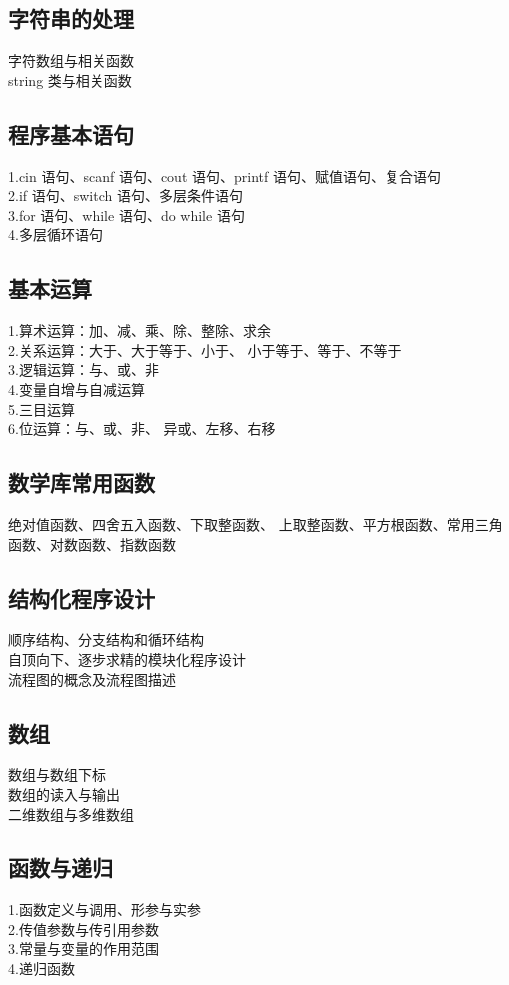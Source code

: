 \documentclass[12pt,twiside,a4paper]{ctexbook}
\numberwithin{chapter}{part}
\begin{document}
\subsection{字符串的处理}
字符数组与相关函数\\
string 类与相关函数

\subsection{程序基本语句}
1.cin 语句、scanf 语句、cout 语句、printf
语句、赋值语句、复合语句\\
2.if 语句、switch 语句、多层条件语句\\
3.for 语句、while 语句、do while 语句\\
4.多层循环语句

\subsection{基本运算}
1.算术运算：加、减、乘、除、整除、求余\\
2.关系运算：大于、大于等于、小于、
小于等于、等于、不等于\\
3.逻辑运算：与、或、非\\
4.变量自增与自减运算\\
5.三目运算\\
6.位运算：与、或、非、
异或、左移、右移

\subsection{数学库常用函数}
绝对值函数、四舍五入函数、下取整函数、
上取整函数、平方根函数、常用三角
函数、对数函数、指数函数

\subsection{结构化程序设计}
顺序结构、分支结构和循环结构\\
自顶向下、逐步求精的模块化程序设计\\
流程图的概念及流程图描述

\subsection{数组}
数组与数组下标\\
数组的读入与输出\\
二维数组与多维数组

\subsection{函数与递归}
1.函数定义与调用、形参与实参\\
2.传值参数与传引用参数\\
3.常量与变量的作用范围\\
4.递归函数
\end{document}
